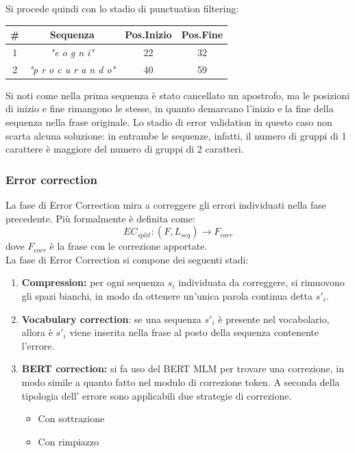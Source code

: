 Si procede quindi con lo stadio di punctuation filtering:
\begin{table}[H]
\centering
\begin{tabular}{cccc}
\#&\textbf{Sequenza} & \textbf{Pos.Inizio} & \textbf{Pos.Fine}\\ \hline
1&\textit{"e o g n i"}&22& 32\\
2&\textit{"p r o c u r a n d o"}& 40& 59\\
\end{tabular}
\end{table}
Si noti come nella prima sequenza è stato cancellato un apostrofo, ma le posizioni di inizio e fine rimangono le stesse, in quanto demarcano l'inizio e la fine della sequenza nella frase originale. Lo stadio di error validation in questo caso non scarta alcuna soluzione: in entrambe le sequenze, infatti, il numero di gruppi di 1 carattere è maggiore del numero di gruppi di 2 caratteri.

\subsubsection{Error correction}
\label{sec:met_split_errcor}
La fase di Error Correction mira a correggere gli errori individuati nella fase precedente. Più formalmente è definita come:
\begin{equation}
EC_{split}: (F,L_{seq}) \rightarrow F_{corr}
\end{equation}
dove $F_{corr}$ è la frase con le correzione apportate.\\
La fase di Error Correction si compone dei seguenti stadi:
\begin{enumerate}
\item \textbf{Compression:} per ogni sequenza $s_i$ individuata da correggere, si rimuovono gli spazi bianchi, in modo da ottenere un'unica parola continua detta $s\prime_i$.
\item \textbf{Vocabulary correction}: se una sequenza $s\prime_i$ è presente nel vocabolario, allora è $s\prime_i$ viene inserita nella frase al posto della sequenza contenente l'errore.
\item \textbf{BERT correction:} si fa uso del BERT MLM per trovare una correzione, in modo simile a quanto fatto nel modulo di correzione token. A seconda della tipologia dell' errore sono applicabili due strategie di correzione.
		\begin{itemize}
		\item Con sottrazione		
		\item Con rimpiazzo		
		\end{itemize}
\end{enumerate}

